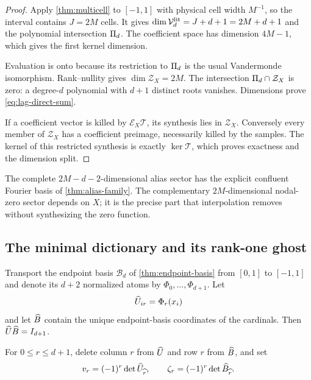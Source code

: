 \begin{proof}
Apply \cref{thm:multicell} to $[-1,1]$ with physical cell width $M^{-1}$,
so the interval contains $J=2M$ cells.  It gives
$\dim\mathcal V_d^{\rm lit}=J+d+1=2M+d+1$ and the polynomial intersection
$\Pi_d$.  The coefficient space has dimension $4M-1$, which gives the first
kernel dimension.

Evaluation is onto because its restriction to $\Pi_d$ is the usual
Vandermonde isomorphism.  Rank--nullity gives $\dim\mathcal Z_X=2M$.
The intersection $\Pi_d\cap\mathcal Z_X$ is zero: a degree-$d$ polynomial
with $d+1$ distinct roots vanishes.  Dimensions prove
\eqref{eq:lag-direct-sum}.

If a coefficient vector is killed by $\mathcal E_X\mathcal T$, its synthesis
lies in $\mathcal Z_X$.  Conversely every member of $\mathcal Z_X$ has a
coefficient preimage, necessarily killed by the samples.  The kernel of this
restricted synthesis is exactly $\ker\mathcal T$, which proves exactness and
the dimension split.
\end{proof}

The complete $2M-d-2$-dimensional alias sector has the explicit confluent
Fourier basis of \cref{thm:alias-family}.  The complementary $2M$-dimensional
nodal-zero sector depends on $X$; it is the precise part that interpolation
removes without synthesizing the zero function.

\subsection{The minimal dictionary and its rank-one ghost}

Transport the endpoint basis $\mathcal B_d$ of
\cref{thm:endpoint-basis} from $[0,1]$ to $[-1,1]$ and denote its
$d+2$ normalized atoms by $\Phi_0,\ldots,\Phi_{d+1}$.  Let
\[
 \widehat U_{ir}=\Phi_r(x_i)
\]
and let $\widehat B$ contain the unique endpoint-basis coordinates of the
cardinals.  Then $\widehat U\widehat B=I_{d+1}$.

For $0\le r\le d+1$, delete column $r$ from $\widehat U$ and row $r$ from
$\widehat B$, and set
\begin{equation}
 v_r=(-1)^r\det\widehat U_{\widehat{r}},
 \qquad
 \zeta_r=(-1)^r\det\widehat B_{\widehat{r}}.
 \label{eq:lag-cofactor-vectors}
\end{equation}

